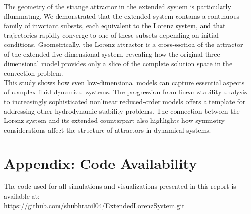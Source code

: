 \documentclass[paper=a4, fontsize=11pt]{scrartcl}
\numberwithin{equation}{section}		%
\numberwithin{figure}{section}			%
\numberwithin{table}{section}				%
\begin{document}
The geometry of the strange attractor in the extended system is particularly illuminating. We demonstrated that the extended system contains a continuous family of invariant subsets, each equivalent to the Lorenz system, and that trajectories rapidly converge to one of these subsets depending on initial conditions. Geometrically, the Lorenz attractor is a cross-section of the attractor of the extended five-dimensional system, revealing how the original three-dimensional model provides only a slice of the complete solution space in the convection problem.
\\

This study shows how even low-dimensional models can capture essential aspects of complex fluid dynamical systems. The progression from linear stability analysis to increasingly sophisticated nonlinear reduced-order models offers a template for addressing other hydrodynamic stability problems. The connection between the Lorenz system and its extended counterpart also highlights how symmetry considerations affect the structure of attractors in dynamical systems.

\section*{Appendix: Code Availability}
The code used for all simulations and visualizations presented in this report is available at: \\
\url{https://github.com/shubhranil04/ExtendedLorenzSystem.git}



\end{document}
